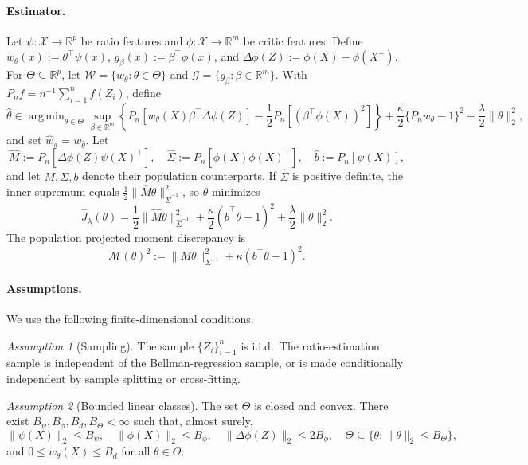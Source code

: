 \documentclass{article}
\DeclareMathOperator*{\argmin}{arg\,min}
\theoremstyle{plain}
\theoremstyle{definition}
\theoremstyle{remark}
\newtheorem{assumption}{Assumption}
\begin{document}
\paragraph{Estimator.}
Let \(\psi:\mathcal X\to\mathbb R^p\) be ratio features and
\(\phi:\mathcal X\to\mathbb R^m\) be critic features. Define
\(w_\theta(x):=\theta^\top\psi(x)\), \(g_\beta(x):=\beta^\top\phi(x)\), and
\(\Delta\phi(Z):=\phi(X)-\phi(X^+)\). For
\(\Theta\subseteq\mathbb R^p\), let
\(\mathcal W=\{w_\theta:\theta\in\Theta\}\) and
\(\mathcal G=\{g_\beta:\beta\in\mathbb R^m\}\). With
\(P_nf=n^{-1}\sum_{i=1}^n f(Z_i)\), define
\begin{equation}
\label{eq:app-empirical-saddle}
\widehat\theta
\in
\argmin_{\theta\in\Theta}
\sup_{\beta\in\mathbb R^m}
\left\{
P_n[w_\theta(X)\beta^\top\Delta\phi(Z)]
-\frac12 P_n[(\beta^\top\phi(X))^2]
\right\}
+\frac{\kappa}{2}\{P_n w_\theta-1\}^2
+\frac{\lambda}{2}\|\theta\|_2^2 ,
\end{equation}
and set \(\widehat w_\pi=w_{\widehat\theta}\). Let
\[
\widehat M:=P_n[\Delta\phi(Z)\psi(X)^\top],\quad
\widehat\Sigma:=P_n[\phi(X)\phi(X)^\top],\quad
\widehat b:=P_n[\psi(X)],
\]
and let \(M,\Sigma,b\) denote their population counterparts. If
\(\widehat\Sigma\) is positive definite, the inner supremum equals
\(\frac12\|\widehat M\theta\|_{\widehat\Sigma^{-1}}^2\), so
\(\widehat\theta\) minimizes
\[
\widehat J_\lambda(\theta)
=
\frac12\|\widehat M\theta\|_{\widehat\Sigma^{-1}}^2
+\frac{\kappa}{2}(\widehat b^\top\theta-1)^2
+\frac{\lambda}{2}\|\theta\|_2^2 .
\]
The population projected moment discrepancy is
\[
\mathcal M(\theta)^2
:=
\|M\theta\|_{\Sigma^{-1}}^2
+\kappa(b^\top\theta-1)^2 .
\]

\paragraph{Assumptions.}
We use the following finite-dimensional conditions.

\begin{assumption}[Sampling]
\label{ass:app-sampling}
The sample \(\{Z_i\}_{i=1}^n\) is i.i.d.\ The ratio-estimation sample is
independent of the Bellman-regression sample, or is made conditionally
independent by sample splitting or cross-fitting.
\end{assumption}

\begin{assumption}[Bounded linear classes]
\label{ass:app-bounded-linear}
The set \(\Theta\) is closed and convex. There exist
\(B_\psi,B_\phi,B_d,B_\Theta<\infty\) such that, almost surely,
\[
\|\psi(X)\|_2\le B_\psi,\quad
\|\phi(X)\|_2\le B_\phi,\quad
\|\Delta\phi(Z)\|_2\le 2B_\phi,\quad
\Theta\subseteq\{\theta:\|\theta\|_2\le B_\Theta\},
\]
and \(0\le w_\theta(X)\le B_d\) for all \(\theta\in\Theta\).
\end{assumption}
\end{document}
